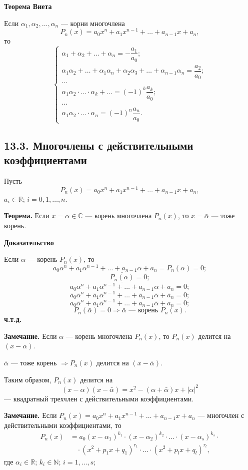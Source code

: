 \documentclass[12pt,a4paper]{article}
\begin{document}
\textbf{Теорема Виета}

Если $\alpha_1,\alpha_2,\ldots,\alpha_n$ --- корни многочлена
$$
P_n(x)=a_0x^n+a_1x^{n-1}+\ldots+a_{n-1}x+a_n,
$$
то
$$
\begin{cases}
\alpha_1+\alpha_2+\ldots+\alpha_n=-\dfrac{a_1}{a_0};\\[1mm]
\alpha_1\alpha_2+\ldots+\alpha_1\alpha_n+\alpha_2\alpha_3+\ldots+\alpha_{n-1}\alpha_n=\dfrac{a_2}{a_0};\\[1mm]
\ldots\\
\alpha_1\alpha_2\cdot\ldots\cdot\alpha_k+\ldots=(-1)^k\dfrac{a_k}{a_0};\\[1mm]
\ldots\\
\alpha_1\alpha_2\cdot\ldots\cdot\alpha_n=(-1)^n\dfrac{a_n}{a_0}.
\end{cases}
$$

\subsection*{\textbf{13.3. Многочлены с действительными коэффициентами}}

Пусть
$$
P_n(x)=a_0x^n+a_1x^{n-1}+\ldots+a_{n-1}x+a_n,
$$
$a_i\in\mathbb R$; $i=0,1,\ldots,n$.

\textbf{Теорема.} Если $x=\alpha\in\mathbb C$ --- корень многочлена
$P_n(x)$, то $x=\bar\alpha$ --- тоже корень.

\textbf{Доказательство}

Если $\alpha$ --- корень $P_n(x)$, то
$$
a_0\alpha^n+a_1\alpha^{n-1}+\ldots+a_{n-1}\alpha+a_n=P_n(\alpha)=0;
$$
$$
\overline{P_n(\alpha)}=\bar0;
$$
$$
\overline{a_0\alpha^n+a_1\alpha^{n-1}+\ldots+a_{n-1}\alpha+a_n}=0;
$$
$$
\bar a_0\bar\alpha^n+\bar a_1\bar\alpha^{n-1}+\ldots+\bar
a_{n-1}\bar\alpha+\bar a_n=0;
$$
$$
a_0\bar\alpha^n+a_1\bar\alpha^{n-1}+\ldots+a_{n-1}\bar\alpha+a_n=0;
$$
$$
P_n(\bar\alpha)=0\Rightarrow \bar\alpha \text{ --- корень } P_n(x).
$$
\textbf{ч.т.д.}

\textbf{Замечание.} Если $\alpha$ --- корень многочлена $P_n(x)$, то
$P_n(x)$ делится на $(x-\alpha)$.

$\bar\alpha$ --- тоже корень $\Rightarrow P_n(x)$ делится на $(x-\bar\alpha)$.

Таким образом, $P_n(x)$ делится на
$$
(x-\alpha)(x-\bar\alpha)=x^2-(\alpha+\bar\alpha)x+|\alpha|^2
$$
--- квадратный трехчлен с действительными коэффициентами.

\textbf{Замечание.} Если
$P_n(x)=a_0x^n+a_1x^{n-1}+\ldots+a_{n-1}x+a_n$ --- многочлен с
действительными коэффициентами, то
\begin{equation}
\begin{aligned}
P_n(x)&=a_0(x-\alpha_1)^{k_1}\cdot(x-\alpha_2)^{k_2}\cdot\ldots\cdot(x-\alpha_s)^{k_s}\cdot\\
&\quad\cdot(x^2+p_1x+q_1)^{r_1}\cdot\ldots\cdot(x^2+p_lx+q_l)^{r_l},
\end{aligned}
\tag{13.6}
\end{equation}
где $\alpha_i\in\mathbb R$; $k_i\in\mathbb N$; $i=1,\ldots,s$;
\end{document}
